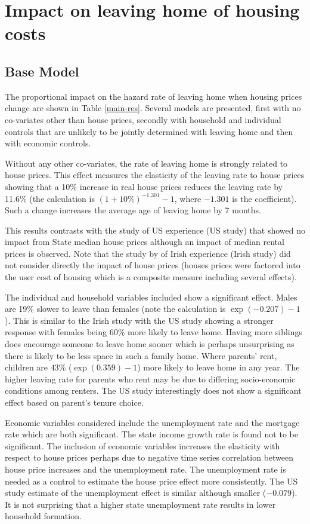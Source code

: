 \documentclass[12pt]{article}
\begin{document}
\section{Impact on leaving home of housing costs}
\subsection{Base Model}
The proportional impact on the hazard rate of leaving home when housing prices change are shown in Table \ref{main-res}. Several models are presented, first with no co-variates other than house prices, secondly with household and individual controls that are unlikely to be jointly determined with leaving home and then with economic controls.



Without any other co-variates, the rate of leaving home is strongly related to house prices. This effect measures the elasticity of the leaving rate to house prices showing that a 10\% increase in real house prices reduces the leaving rate by 11.6\% (the calculation is $(1+10\%)^{-1.301} - 1$, where $-1.301$ is the coefficient). Such a change increases the average age of leaving home by 7 months.

This results contrasts with the \cite{lee2013happens} study of US experience (US study) that showed no impact from State median house prices although an impact of median rental prices is observed. Note that the study by \cite{byrne2014household} of Irish experience (Irish study) did not consider directly the impact of house prices (houses prices were factored into the user cost of housing which is a composite measure including several effects).

The individual and household variables included show a significant effect. Males are 19\% slower to leave than females (note the calculation is $\exp(-0.207)-1$). This is similar to the Irish study with the US study showing a  stronger response with females being 60\% more likely to leave home. Having more siblings does encourage someone to leave home sooner which is perhaps unsurprising as there is likely to be less space in such a family home. Where parents' rent, children are $43\%$ ($\exp(0.359)-1$) more likely to leave home in any year. The higher leaving rate for parents who rent may be due to differing socio-economic conditions among renters. The US study interestingly does not show a significant effect based on parent's tenure choice.

Economic variables considered include the unemployment rate and the mortgage rate which are both significant. The state income growth rate is found not to be significant. The inclusion of economic variables increases the elasticity with respect to house prices perhaps due to negative time series correlation between house price increases and the unemployment rate. The unemployment rate is needed as a control to estimate the house price effect more consistently.  The US study estimate of the unemployment effect is similar although smaller ($-0.079$). It is not surprising that a higher state unemployment rate results in lower household formation.
\end{document}
